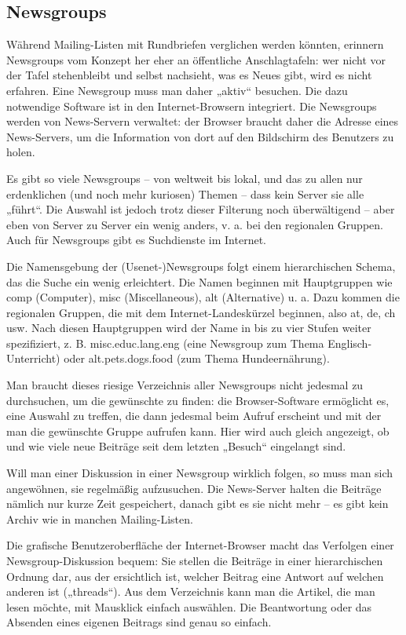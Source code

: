\documentclass[]{book}
\theoremstyle{definition}
\theoremstyle{definition}
\theoremstyle{definition}
\theoremstyle{remark}
\begin{document}
\subsection{Newsgroups}\label{newsgroups}

Während Mailing-Listen mit Rundbriefen verglichen werden könnten,
erinnern Newsgroups vom Konzept her eher an öffentliche Anschlagtafeln:
wer nicht vor der Tafel stehenbleibt und selbst nachsieht, was es Neues
gibt, wird es nicht erfahren. Eine Newsgroup muss man daher „aktiv``
besuchen. Die dazu notwendige Software ist in den Internet-Browsern
integriert. Die Newsgroups werden von News-Servern verwaltet: der
Browser braucht daher die Adresse eines News-Servers, um die Information
von dort auf den Bildschirm des Benutzers zu holen.

Es gibt so viele Newsgroups -- von weltweit bis lokal, und das zu allen
nur erdenklichen (und noch mehr kuriosen) Themen -- dass kein Server sie
alle „führt``. Die Auswahl ist jedoch trotz dieser Filterung noch
überwältigend -- aber eben von Server zu Server ein wenig anders, v. a.
bei den regionalen Gruppen. Auch für Newsgroups gibt es Suchdienste im
Internet.

Die Namensgebung der (Usenet-)Newsgroups folgt einem hierarchischen
Schema, das die Suche ein wenig erleichtert. Die Namen beginnen mit
Hauptgruppen wie comp (Computer), misc (Miscellaneous), alt
(Alternative) u. a. Dazu kommen die regionalen Gruppen, die mit dem
Internet-Landeskürzel beginnen, also at, de, ch usw. Nach diesen
Hauptgruppen wird der Name in bis zu vier Stufen weiter spezifiziert, z.
B. misc.educ.lang.eng (eine Newsgroup zum Thema Englisch-Unterricht)
oder alt.pets.dogs.food (zum Thema Hundeernährung).

Man braucht dieses riesige Verzeichnis aller Newsgroups nicht jedesmal
zu durchsuchen, um die gewünschte zu finden: die Browser-Software
ermöglicht es, eine Auswahl zu treffen, die dann jedesmal beim Aufruf
erscheint und mit der man die gewünschte Gruppe aufrufen kann. Hier wird
auch gleich angezeigt, ob und wie viele neue Beiträge seit dem letzten
„Besuch`` eingelangt sind.

Will man einer Diskussion in einer Newsgroup wirklich folgen, so muss
man sich angewöhnen, sie regelmäßig aufzusuchen. Die News-Server halten
die Beiträge nämlich nur kurze Zeit gespeichert, danach gibt es sie
nicht mehr -- es gibt kein Archiv wie in manchen Mailing-Listen.

Die grafische Benutzeroberfläche der Internet-Browser macht das
Verfolgen einer Newsgroup-Diskussion bequem: Sie stellen die Beiträge in
einer hierarchischen Ordnung dar, aus der ersichtlich ist, welcher
Beitrag eine Antwort auf welchen anderen ist („threads``). Aus dem
Verzeichnis kann man die Artikel, die man lesen möchte, mit Mausklick
einfach auswählen. Die Beantwortung oder das Absenden eines eigenen
Beitrags sind genau so einfach.
\end{document}
